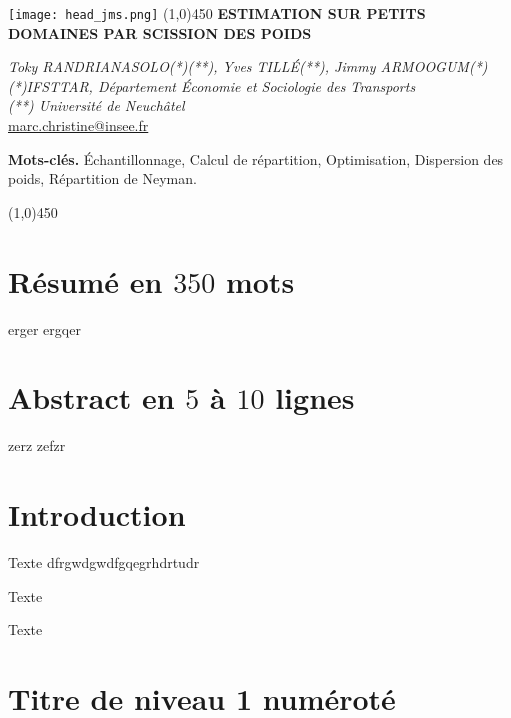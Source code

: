 \documentclass[12pt, a4paper]{article}
\begin{document}
\begin{center}
\texttt{[image: head\_jms.png]} 
\line(1,0){450}
\vspace{5mm}
\textbf{{\huge E}\Large STIMATION SUR PETITS DOMAINES PAR SCISSION DES POIDS}
\end{center}

\begin{center}
\textit{Toky RANDRIANASOLO(*)(**), Yves TILL\'E(**), Jimmy ARMOOGUM(*)} \\
\vspace{2mm}
\textit{(*)IFSTTAR, Département \'Economie et Sociologie des Transports}\\ 
\textit{(**) Université de Neuchâtel} \\
\vspace{2mm}
\url{marc.christine@insee.fr} 
\end{center}
\vspace{5mm}
\small{{\bf Mots-cl\'es.} \'Echantillonnage, Calcul de répartition, Optimisation, Dispersion des poids, Répartition de Neyman.}

\begin{center}
\line(1,0){450}
\end{center}


\section*{Résumé en $350$ mots}
erger
ergqer

\section*{Abstract en $5$ à $10$ lignes}

zerz
zefzr



\section*{Introduction}

Texte
dfrgwdgwdfgqegrhdrtudr

Texte

Texte

\section{Titre de niveau 1 numéroté}
\end{document}
